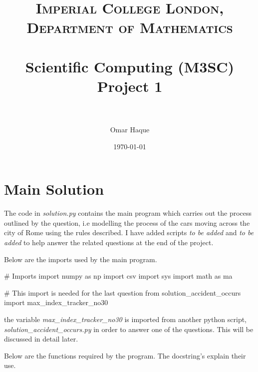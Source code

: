 \documentclass[paper=a4, fontsize=12pt]{scrartcl} %
\title{
\normalfont \normalsize
\textsc{Imperial College London, Department of Mathematics} \\ [25pt]
\horrule{0.5pt} \\[0.4cm]                      %
\huge Scientific Computing (M3SC) Project 1 \\           %
\horrule{2pt} \\[0.5cm]                        %
}
\author{Omar Haque}
\date{\normalsize\today}
\numberwithin{equation}{section}       %
\numberwithin{figure}{section}         %
\numberwithin{table}{section}          %
\begin{document}

\maketitle

\section{Main Solution}

The code in \textit{solution.py} contains the main program which carries out the process outlined by the question, i.e modelling the process of the cars moving across the city of Rome using the rules described. I have added scripts \textit{to be added} and \textit{to be added} to help answer the related questions at the end of the project.
\newline

Below are the imports used by the main program.

\begin{python}
# Imports
import numpy as np
import csv
import sys
import math as ma

# This import is needed for the last question
from solution_accident_occurs import max_index_tracker_no30
\end{python}

the variable \textit{max\_index\_tracker\_no30} is imported from another python script, 
\newline
\textit{solution\_accident\_occurs.py} in order to answer one of the questions. This will be discussed in detail later.
\leavevmode
\newline

Below are the functions required by the program. The docstring's explain their use.

\leavevmode
\newline
\end{document}
